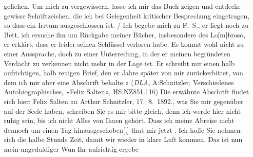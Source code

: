 \begin{ledgroupsized}[t]{13cm}
{{{                        geliehen. Um mich zu vergewissern, lasse ich mir das Buch zeigen und
                        entdecke gewisse Schriftzeichen, die ich bei Gelegenheit kritischer
                        Besprechung eingetragen, so dass ein Irrtum ausgeschlossen ist.{ / }Ich begebe mich zu F. S., er
                        liegt noch zu Bett, ich ersuche ihn um Rückgabe meiner Bücher, insbesondere
                        des Lo{[}m{]}broso, er erklärt,
                        dass er leider seinen Schlüssel verloren habe. Es kommt wohl nicht zu einer
                        Aussprache, doch zu einer Unterredung, in der er meinen begründeten Verdacht
                        zu verkennen nicht mehr in der Lage ist. Er schreibt mir einen halb
                        aufrichtigen, halb reuigen Brief, den er Jahre später von mir
                        zurückerbittet, von dem ich mir aber eine Abschrift behalte.«
                        (\emph{DLA}, A:Schnitzler, Verschiedenes
                           Autobiographisches, »Felix Salten«, HS.NZ851.116) Die erwähnte Abschrift findet sich hier: Felix Salten an Arthur Schnitzler, 17. 8. 1892.}}}\label{K_L03186-1h}, was Sie mir
               gegenüber auf der Seele haben, schreiben Sie es mir bitte gleich, denn ich werde hier
               nicht ruhig sein, bis ich nicht Alles von Ihnen gehört. Dass ich meine Abreise nicht
               dennoch um einen Tag hinausgeschoben{[},{]} thut mir jetzt . Ich hoffe Sie nehmen sich die halbe Stunde
               Zeit, damit wir wieder in klare Luft kommen. Das ist nun mein ungeduldiger Wun\pend
           \pstart Ihr aufrichtig er\textcolor{gray}{g}ebe\pend{}
         
         \endnumbering{}\end{ledgroupsized}  \newcommand{\dateiname}{L03186}\newcommand{\titel}{Felix Salten an Arthur Schnitzler, 10. 8. 1892}\newcommand{\editorInnen}{Martin Anton Müller und Laura Untner}
      